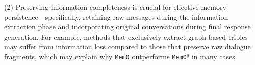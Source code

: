 

(2) Preserving information completeness is crucial for effective memory persistence---specifically, retaining raw messages during the information extraction phase and incorporating original conversations during final response generation. For example, methods that exclusively extract graph-based triples may suffer from information loss compared to those that preserve raw dialogue fragments, which may explain why {\tt Mem0} outperforms {\tt Mem0$^g$} in many cases.


